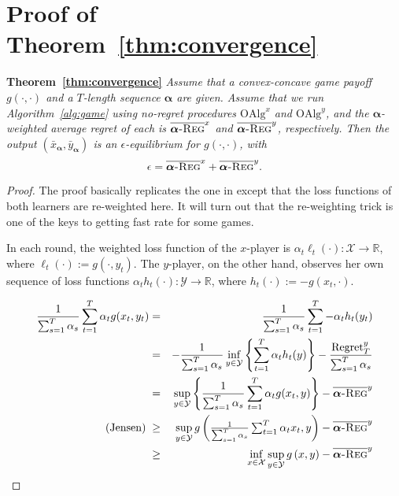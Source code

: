 \documentclass[final,12pt]{colt2018} %
\def\reals{\mathbb{R}}
\def\reals{\mathbb{R}}
\def\balpha{\boldsymbol{\alpha}}
\def\alg{\text{OAlg}}
\newcommand{\avgregret}[1]{\overline{\balpha\textsc{-Reg}}^{#1}}
\newcommand{\XX}{\mathcal{X}}
\newcommand{\YY}{\mathcal{Y}}
\begin{document}
\section{Proof of Theorem~\ref{thm:convergence}} \label{app:thm:convergence}

\textbf{Theorem~\ref{thm:convergence}} 
\textit{
  Assume that a convex-concave game payoff $g(\cdot, \cdot)$ and a $T$-length sequence $\balpha$ are given. Assume that we run Algorithm~\ref{alg:game} using no-regret procedures $\alg^x$ and $\alg^y$, and the $\balpha$-weighted average regret of each is $\avgregret{x}$ and $\avgregret{y}$, respectively. Then the output  $(\bar{x}_{\balpha},\bar{y}_{\balpha})$ is an $\epsilon$-equilibrium for $g(\cdot, \cdot)$, with
  \[
    \epsilon = \avgregret{x} + \avgregret{y}.
  \] 
} 

\begin{proof}
The proof basically replicates the one in \cite{AW17} 
except that the loss functions of both learners are re-weighted here.
It will turn out that the re-weighting trick is one of the keys to getting fast rate for some games.

In each round, the weighted loss function of the $x$-player is $\alpha_t \ell_t(\cdot) : \XX \to \reals$, where $\ell_t(\cdot) := g(\cdot, y_t)$. The $y$-player, on the other hand, observes her own sequence of loss functions $\alpha_t  h_t(\cdot) : \YY \to \reals$, where $h_t(\cdot) := -  g(x_t, \cdot)$.


\begin{eqnarray}
\frac{1}{\sum_{s=1}^T \alpha_s}   \sum_{t=1}^T \alpha_t g(x_t, y_t) 
  & = & \frac{1}{\sum_{s=1}^T \alpha_s} \sum_{t=1}^T  - \alpha_t  h_t(y_t)  \notag \\
  \text{} \; & = & 
    - \frac{1}{\sum_{s=1}^T \alpha_s} \inf_{y \in \YY} \left\{ \sum_{t=1}^T  \alpha_t  h_t(y) \right\} - \frac{ \text{Regret}_T^y }{  \sum_{s=1}^T \alpha_s } \notag \\
  \; & = &
    \sup_{y \in \YY} \left\{ \frac{1}{\sum_{s=1}^T \alpha_s} \sum_{t=1}^T  \alpha_t g( x_t , y ) \right\} - \avgregret{y}  \notag \\
  \text{(Jensen)} \;  & \geq & 
    \sup_{y \in \YY} g\left({\textstyle \frac{1}{\sum_{s=1}^T \alpha_s} \sum_{t=1}^T  \alpha_t x_t }, y \right)  - \avgregret{y} 
     \label{eq:ylowbound}  \\
  & \geq & \inf_{x \in \XX} \sup_{y \in \YY} g\left( x , y \right) - \avgregret{y}  \notag
\end{eqnarray}


\end{proof}
\end{document}

